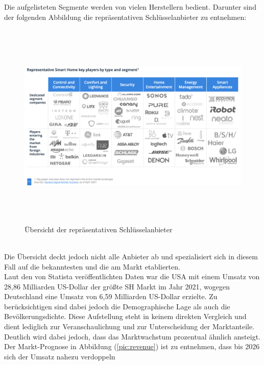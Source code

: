         \pagebreak
        Die aufgelisteten Segmente werden von vielen Herstellern bedient. Darunter sind der folgenden Abbildung die 
        repräsentativen Schlüsselanbieter zu entnehmen:
        \begin{figure}[hbt!]
            \centering
            \includegraphics[width=15cm,height=10cm,keepaspectratio]{images/keyplayers.png}
            \caption{Übersicht der repräsentativen Schlüsselanbieter \cite{statista2021}} 
            \label{pic:landscape}
        \end{figure}
        \\
        Die Übersicht deckt jedoch nicht alle Anbieter ab und spezialisiert sich in diesem Fall auf die bekanntesten und die am 
        Markt etablierten. 
        \\
        \linebreak
        Laut den von Statista veröffentlichten Daten war die USA mit einem Umsatz von 28,86 Milliarden US-Dollar der größte 
        \acl{SH} Markt im Jahr 2021, wogegen Deutschland eine Umsatz von 6,59 Milliarden US-Dollar erzielte. Zu berücksichtigen sind 
        dabei jedoch die Demographische Lage als auch die Bevölkerungsdichte. Diese Aufstellung steht in keinem direkten Vergleich und 
        dient lediglich zur Veranschaulichung und zur Unterscheidung der Marktanteile. Deutlich wird dabei jedoch, dass das 
        Marktwachstum prozentual ähnlich ansteigt. 
        \\
        \linebreak
        Der Markt-Prognose in Abbildung (\ref{pic:revenue}) ist zu entnehmen, dass bis 2026 sich der Umsatz nahezu verdoppeln 
